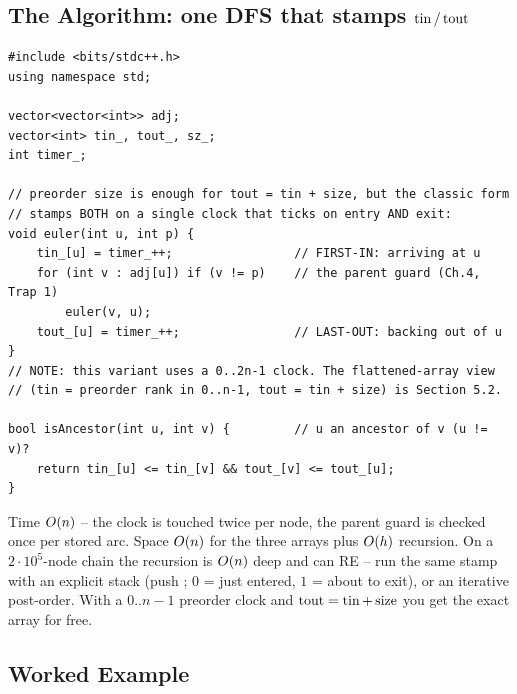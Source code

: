 \subsection{The Algorithm: one DFS that stamps \texorpdfstring{$\operatorname{tin}/\operatorname{tout}$}{tin/tout}}

\begin{lstlisting}[caption={Stamp entry/exit times and answer ancestry in O(1)}, label={lst:c24-stamp}]
#include <bits/stdc++.h>
using namespace std;

vector<vector<int>> adj;
vector<int> tin_, tout_, sz_;
int timer_;

// preorder size is enough for tout = tin + size, but the classic form
// stamps BOTH on a single clock that ticks on entry AND exit:
void euler(int u, int p) {
    tin_[u] = timer_++;                 // FIRST-IN: arriving at u
    for (int v : adj[u]) if (v != p)    // the parent guard (Ch.4, Trap 1)
        euler(v, u);
    tout_[u] = timer_++;                // LAST-OUT: backing out of u
}
// NOTE: this variant uses a 0..2n-1 clock. The flattened-array view
// (tin = preorder rank in 0..n-1, tout = tin + size) is Section 5.2.

bool isAncestor(int u, int v) {         // u an ancestor of v (u != v)?
    return tin_[u] <= tin_[v] && tout_[v] <= tout_[u];
}
\end{lstlisting}
\begin{complexitybox}
Time $O(n)$ -- the clock is touched twice per node, the parent guard is checked once per
stored arc. Space $O(n)$ for the three arrays plus $O(h)$ recursion. On a
$2\cdot10^{5}$-node chain the recursion is $O(n)$ deep and can RE -- run the same stamp
with an explicit stack (push ;  $0$ = just entered,
$1$ = about to exit), or an iterative post-order. With a $0..n-1$ preorder clock and
$\operatorname{tout}=\operatorname{tin}+\operatorname{size}$ you get the exact  array for free.
\end{complexitybox}

\subsection{Worked Example}

